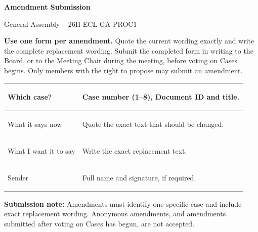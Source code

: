 \documentclass{../../../Common/Latex/Templates/rapport}
\date{\meetingdate, \meetingtime}
\begin{document}
\reportmainmatter
\small
\setlength{\parindent}{0pt}
\setlength{\tabcolsep}{6pt}
\renewcommand{\arraystretch}{1.2}

\begin{center}
  {\Large\bfseries Amendment Submission}\par
  \vspace{0.15cm}
  {\normalsize General Assembly -- 26H-ECL-GA-PROC1}\par
  \vspace{0.1cm}
  {\small \meetingline}\par
\end{center}

\vspace{0.2cm}
\textbf{Use one form per amendment.} Quote the current wording exactly and write the complete replacement wording. Submit the completed form in writing to the Board, or to the Meeting Chair during the meeting, before voting on Cases begins. Only members with the right to propose may submit an amendment.

\vspace{0.4cm}
\begin{tabularx}{\textwidth}{|>{\bfseries\raggedright\arraybackslash}p{3.7cm}|X|}
  \hline
  Which case?           & \rule{0pt}{1.2cm}Case number (1--8), Document ID and title.   \\
  \hline
  What it says now      & \rule{0pt}{3.2cm}Quote the exact text that should be changed. \\
  \hline
  What I want it to say & \rule{0pt}{3.2cm}Write the exact replacement text.            \\
  \hline
  Sender                & \rule{0pt}{1.2cm}Full name and signature, if required.        \\
  \hline
\end{tabularx}

\vfill
\textbf{Submission note:} Amendments must identify one specific case and include exact replacement wording. Anonymous amendments, and amendments submitted after voting on Cases has begun, are not accepted.
\end{document}
